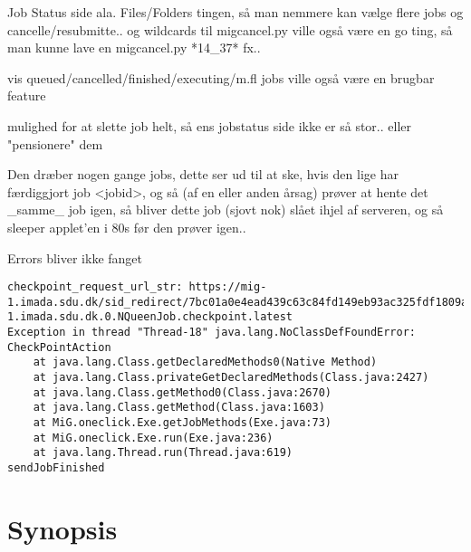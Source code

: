 \documentclass[pdf,draft,a4paper,11pt]{article}
\begin{document}
Job Status side ala. Files/Folders
tingen, så man nemmere kan vælge flere jobs og cancelle/resubmitte.. og
wildcards til migcancel.py ville også være en go ting, så man kunne lave en
migcancel.py *14\_37* fx.. 

vis queued/cancelled/finished/executing/m.fl jobs ville også være en brugbar feature

mulighed for at slette job helt, så ens jobstatus side ikke er så stor.. eller
"pensionere" dem

Den dræber nogen gange jobs, dette ser ud til at ske, hvis den lige har
færdiggjort job <jobid>, og så (af en eller anden årsag) prøver at hente det
\_samme\_ job igen, så bliver dette job (sjovt nok) slået ihjel af serveren, og
så sleeper applet'en i 80s før den prøver igen.. 

Errors bliver ikke fanget
\begin{verbatim}
checkpoint_request_url_str: https://mig-1.imada.sdu.dk/sid_redirect/7bc01a0e4ead439c63c84fd149eb93ac325fdf1809aedc23049c010890bf14bd/13768_6_2_2007__8_42_57_mig-1.imada.sdu.dk.0.NQueenJob.checkpoint.latest
Exception in thread "Thread-18" java.lang.NoClassDefFoundError: CheckPointAction
	at java.lang.Class.getDeclaredMethods0(Native Method)
	at java.lang.Class.privateGetDeclaredMethods(Class.java:2427)
	at java.lang.Class.getMethod0(Class.java:2670)
	at java.lang.Class.getMethod(Class.java:1603)
	at MiG.oneclick.Exe.getJobMethods(Exe.java:73)
	at MiG.oneclick.Exe.run(Exe.java:236)
	at java.lang.Thread.run(Thread.java:619)
sendJobFinished
\end{verbatim}

%



\appendix


%
%
\section{Synopsis}
%


%
%
\end{document}
